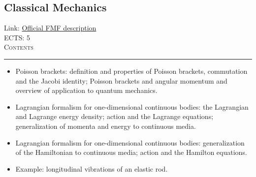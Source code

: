 \documentclass[11pt, a4paper]{article}
\newenvironment{course}[3]{
\subsection{#1}%
Link: \href{#2}{Official FMF description}\\%
ECTS: #3%
\vspace{1ex}
\\
{\large \textsc{Contents}}\\[-0.9ex]%
\rule{\textwidth}{0.5pt}
\vspace{-3ex}
}
{}
\newenvironment{chapter}[1]{
\begin{tcolorbox}[title=#1, breakable]
}
{\end{tcolorbox}}
\begin{document}
\begin{course}{Classical Mechanics}{https://www.fmf.uni-lj.si/en/study-physics/programmes/1fiz/2020/7000777/courses/1155/}{5}
\begin{chapter}{Hamiltonian mechanics}
\begin{itemize}
            \item Poisson brackets: definition and properties of Poisson brackets, commutation and the Jacobi identity; Poisson brackets and angular momentum and overview of application to quantum mechanics.

        \end{itemize}
    \end{chapter}

    \begin{chapter}{Introduction to continuum mechanics}
        \begin{itemize}
        
            \item Lagrangian formalism for one-dimensional continuous bodies: the Lagrangian and Lagrange energy density; action and the Lagrange equations; generalization of momenta and energy to continuous media.

            \item Lagrangian formalism for one-dimensional continuous bodies: generalization of the Hamiltonian to continuous media; action and the Hamilton equations.

            \item Example: longitudinal vibrations of an elastic rod.

        \end{itemize}
    \end{chapter}
\end{course}
\end{document}
